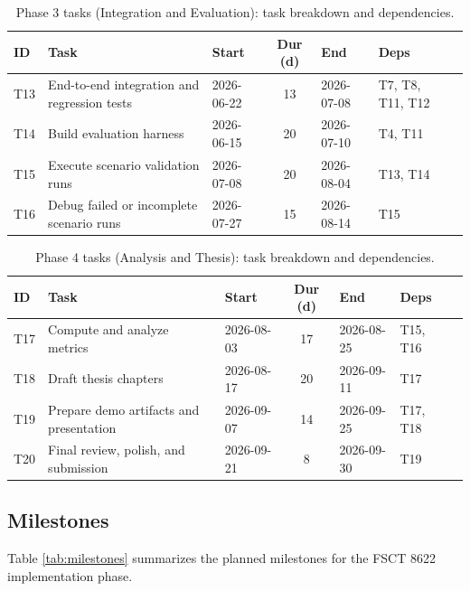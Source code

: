 \documentclass[conference]{IEEEtran}
\begin{document}
\begin{table}[t!]
\centering
\caption{Phase 3 tasks (Integration and Evaluation): task breakdown and dependencies.}
\label{tab:tasks_phase3}
\scriptsize
\setlength{\tabcolsep}{5pt}
\renewcommand{\arraystretch}{1.2}
\begin{tabularx}{\textwidth}{l X l c l l l}
\toprule
\textbf{ID} & \textbf{Task} & \textbf{Start} & \textbf{Dur (d)} & \textbf{End} & \textbf{Deps} \\
\midrule
T13 & End-to-end integration and regression tests & 2026-06-22 & 13 & 2026-07-08 & T7, T8, T11, T12 \\
T14 & Build evaluation harness & 2026-06-15 & 20 & 2026-07-10 & T4, T11 \\
T15 & Execute scenario validation runs & 2026-07-08 & 20 & 2026-08-04 & T13, T14 \\
T16 & Debug failed or incomplete scenario runs & 2026-07-27 & 15 & 2026-08-14 & T15 \\
\bottomrule
\end{tabularx}
\end{table}

\begin{table}[t!]
\centering
\caption{Phase 4 tasks (Analysis and Thesis): task breakdown and dependencies.}
\label{tab:tasks_phase4}
\scriptsize
\setlength{\tabcolsep}{5pt}
\renewcommand{\arraystretch}{1.2}
\begin{tabularx}{\textwidth}{l X l c l l l}
\toprule
\textbf{ID} & \textbf{Task} & \textbf{Start} & \textbf{Dur (d)} & \textbf{End} & \textbf{Deps} \\
\midrule
T17 & Compute and analyze metrics & 2026-08-03 & 17 & 2026-08-25 & T15, T16 \\
T18 & Draft thesis chapters & 2026-08-17 & 20 & 2026-09-11 & T17 \\
T19 & Prepare demo artifacts and presentation & 2026-09-07 & 14 & 2026-09-25 & T17, T18 \\
T20 & Final review, polish, and submission & 2026-09-21 & 8 & 2026-09-30 & T19 \\
\bottomrule
\end{tabularx}
\end{table}

\subsection{Milestones}
Table \ref{tab:milestones} summarizes the planned milestones for the FSCT 8622 implementation phase.
\end{document}
